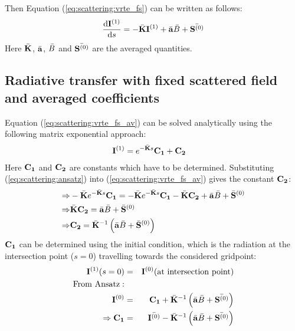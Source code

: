 Then Equation (\ref{eq:scattering:vrte_fs}) can be written as follows:
 \begin{eqnarray}
     \frac{\mathrm{d} {\bf I}^{(1)}}{\mathrm{d} s} =
     -\bar{{\bf K}} {\bf I}^{(1)} + \bar{{\bf a}} \bar{B}
     +\bar{{\bf S}^{(0)}}
\label{eq:scattering:vrte_fs_av}
\end{eqnarray} 
Here $\bar{{\bf K}}$, $\bar{{\bf a}}$, $\bar{B}$ and
$\bar{{\bf S}^{(0)}}$ are the averaged quantities.


\subsection{Radiative transfer with fixed scattered field and averaged
  coefficients}

Equation (\ref{eq:scattering:vrte_fs_av}) can be solved analytically
using the following matrix exponential approach:
 \begin{eqnarray}
 \label{eq:scattering:ansatz}
&   {\bf I}^{(1)} = e^{-\bar{{\bf K}}s}{\bf C_1} + {\bf C_2}
\end{eqnarray}
Here ${\bf C_1}$ and ${\bf C_2}$ are constants which have to be
determined. Substituting (\ref{eq:scattering:ansatz}) into
(\ref{eq:scattering:vrte_fs_av}) gives the constant ${\bf C_2}$:
\begin{eqnarray}
 \Rightarrow& -\bar{{\bf K}}e^{-\bar{{\bf K}}s}{\bf C_1} = -\bar{{\bf K}}e^{-\bar{{\bf K}}s}{\bf C_1} - \bar{{\bf K}} {\bf C_2}+ \bar{{\bf a}} \bar{B} +\bar{{\bf S}}^{(0)}\\
\Rightarrow&  \bar{{\bf K}} {\bf C_2} = \bar{{\bf a}} \bar{B} +\bar{{\bf S}}^{(0)}\\
\Rightarrow& {\bf C_2} =  \bar{{\bf K}}^{-1}\left(\bar{{\bf a}} \bar{B} +\bar{{\bf S}}^{(0)}\right)
 \label{eq:scattering:c1}
\end{eqnarray}
${\bf C_1}$ can be determined using the initial condition, which is
the radiation at the intersection point ($s=0$) travelling towards the
considered gridpoint:
\begin{eqnarray}
   \StoVec^{(1)}(s=0) &=& \StoVec^{(0)} {\rm(at\ intersection\ point)}\\
\rm{From\ Ansatz:} &&\\
\StoVec^{(0)} &=& {\bf C_1} +  \bar{\ExtMat}\Inv\left(\bar{\AbsVec} \bar{\Planck} +\bar{\ScaInt^{(0)}}\right)\\
\Rightarrow   {\bf C_1} &=& \bar{\StoVec^{(0)}} -  \bar{\ExtMat}\Inv \left(\bar{\AbsVec} \bar{\Planck} +\bar{\ScaInt^{(0)}}\right)
\label{eq:scattering:c2}
\end{eqnarray}
